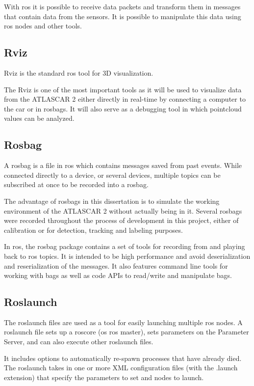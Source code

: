 With \gls{ros} it is possible to receive data packets and transform them in messages that contain data from the sensors. It is possible to manipulate this data using \gls{ros} nodes and other tools. 

\subsection{Rviz}
Rviz is the standard \gls{ros} tool for 3D visualization. %

The Rviz is one of the most important tools as it will be used to visualize data from the ATLASCAR 2 either directly in real-time by connecting a computer to the car or in rosbags. It will also serve as a debugging tool in which pointcloud values can be analyzed. \cite{ROSWiki}

\subsection{Rosbag}

A rosbag is a file in \gls{ros} which contains messages saved from past events. While connected directly to a device, or several devices, multiple topics can be subscribed at once to be recorded into a rosbag. 

The advantage of rosbags in this dissertation is to simulate the working environment of the ATLASCAR 2 without actually being in it. Several rosbags were recorded throughout the process of development in this project, either of calibration or for detection, tracking and labeling purposes. 

In \gls{ros}, the rosbag package contains a set of tools for recording from and playing back to \gls{ros} topics. It is intended to be high performance and avoid deserialization and reserialization of the messages. It also features command line tools for working with bags as well as code APIs to read/write and manipulate bags. \cite{ROSWikia}

\subsection{Roslaunch}
The roslaunch files are used as a tool for easily launching multiple \gls{ros} nodes. A roslaunch file sets up a roscore (os \gls{ros} master), sets parameters on the Parameter Server, and can also execute other roslaunch files. 

It includes options to automatically re-spawn processes that have already died. The roslaunch takes in one or more XML configuration files (with the .launch extension) that specify the parameters to set and nodes to launch.

